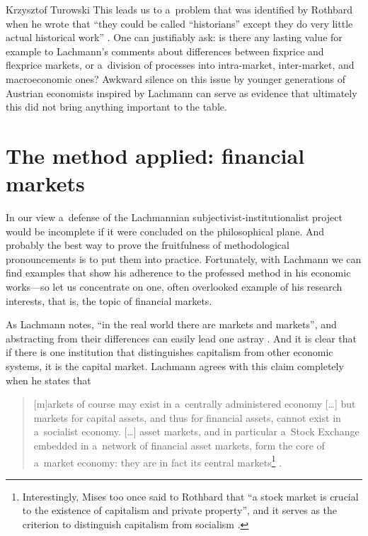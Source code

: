 \begin{artengenv}{Krzysztof Turowski}
This leads us to a~problem that was identified by Rothbard when he wrote that ``they could be called ``historians'' except they do very little actual historical work'' \parencite[53]{rothbard-present}.
One can justifiably ask: is there any lasting value for example to Lachmann's comments about differences between fixprice and flexprice markets, or a~division of processes into intra-market, inter-market, and macroeconomic ones? \parencite[6--14]{lachmann1986market}
Awkward silence on this issue by younger generations of Austrian economists inspired by Lachmann can serve as evidence that ultimately this did not bring anything important to the table.

\section{The method applied: financial markets}
\label{sec:finance}

In our view a~defense of the Lachmannian subjectivist-institutionalist project would be incomplete if it were concluded on the philosophical plane.
And probably the best way to prove the fruitfulness of methodological pronouncements is to put them into practice.
Fortunately, with Lachmann we can find examples that show his adherence to the professed method in his economic works---so let us concentrate on one, often overlooked example of his research interests, that is, the topic of financial markets.

As Lachmann notes, ``in the real world there are markets and markets'', and abstracting from their differences can easily lead one astray \parencite[263--264]{lachmann-speculative-markets}.
And it is clear that if there is one institution that distinguishes capitalism from other economic systems, it is the capital market.
Lachmann agrees with this claim completely when he states that
\begin{quote}
[m]arkets of course may exist in a~centrally administered economy [\ldots] but markets for capital assets, and thus for financial assets, cannot exist in a~socialist economy. [\ldots]
asset markets, and in particular a~Stock Exchange embedded in a~network of financial asset markets, form the core of a~market economy: they are in fact its central markets\footnote{Interestingly, Mises too once said to Rothbard that ``a stock market is crucial to the existence of capitalism and private property'', and it serves as the criterion to distinguish capitalism from socialism \parencite[426]{rothbard-stock}.} \parencite[255]{lachmann-monetary}.
\end{quote}


\end{artengenv}
